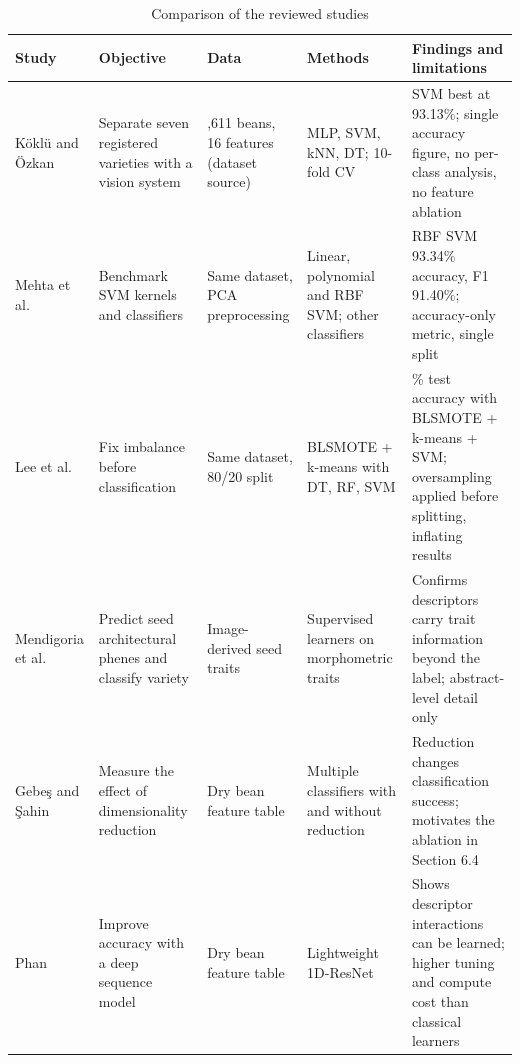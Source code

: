 \begin{table}[htbp]
\centering
\caption{Comparison of the reviewed studies}
\label{tab:literature}
\footnotesize
\renewcommand{\arraystretch}{1.12}
\begin{tabularx}{\textwidth}{@{}>{\raggedright\arraybackslash}p{2.05cm}>{\raggedright\arraybackslash}p{2.5cm}>{\raggedright\arraybackslash}p{2.1cm}>{\raggedright\arraybackslash}p{2.6cm}>{\raggedright\arraybackslash}X@{}}
\toprule
\textbf{Study} & \textbf{Objective} & \textbf{Data} & \textbf{Methods} & \textbf{Findings and limitations} \\
\midrule
Köklü and Özkan \cite{koklu2020} &
Separate seven registered varieties with a vision system &
13,611 beans, 16 features (dataset source) &
MLP, SVM, kNN, DT; 10-fold CV &
SVM best at 93.13\%; single accuracy figure, no per-class analysis, no feature ablation \\
Mehta et al. \cite{mehta2023} &
Benchmark SVM kernels and classifiers &
Same dataset, PCA preprocessing &
Linear, polynomial and RBF SVM; other classifiers &
RBF SVM 93.34\% accuracy, F1 91.40\%; accuracy-only metric, single split \\
Lee et al. \cite{lee2024} &
Fix imbalance before classification &
Same dataset, 80/20 split &
BLSMOTE + k-means with DT, RF, SVM &
97.54\% test accuracy with BLSMOTE + k-means + SVM; oversampling applied before splitting, inflating results \\
Mendigoria et al. \cite{mendigoria2021} &
Predict seed architectural phenes and classify variety &
Image-derived seed traits &
Supervised learners on morphometric traits &
Confirms descriptors carry trait information beyond the label; abstract-level detail only \\
Gebeş and Şahin \cite{gebes2025} &
Measure the effect of dimensionality reduction &
Dry bean feature table &
Multiple classifiers with and without reduction &
Reduction changes classification success; motivates the ablation in Section 6.4 \\
Phan \cite{phan2026} &
Improve accuracy with a deep sequence model &
Dry bean feature table &
Lightweight 1D-ResNet &
Shows descriptor interactions can be learned; higher tuning and compute cost than classical learners \\
\bottomrule
\end{tabularx}
\end{table}
